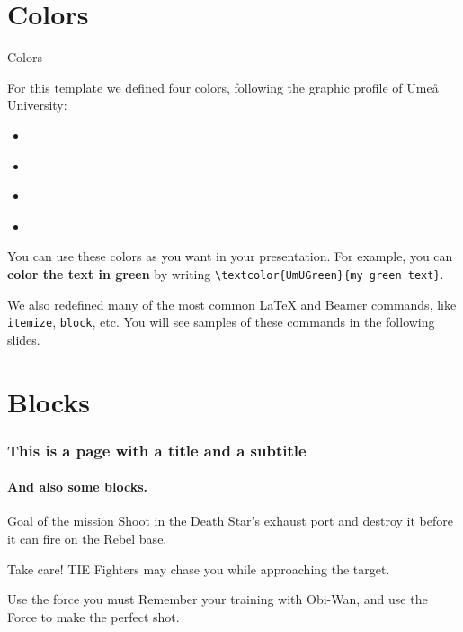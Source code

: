\documentclass[usenames,dvipsnames,10pt]{beamer}
\begin{document}
\section{Colors}

\begin{frame}{Colors}

For this template we defined four colors, following the graphic profile of Umeå University:
\begin{itemize}
\item \textcolor{white}{}
\item \textcolor{white}{}
\item \textcolor{white}{}
\item \textcolor{white}{}
\end{itemize}

\vskip 0.5cm

You can use these colors as you want in your presentation. For example, you can \textbf{\textcolor{UmUGreen}{color the text in green}} by writing \texttt{\textbackslash textcolor\{UmUGreen\}\{my green text\}}.

\vskip 0.5cm

We also redefined many of the most common \LaTeX{} and Beamer commands, like \texttt{itemize}, \texttt{block}, etc. You will see samples of these commands in the following slides.

\end{frame}

\section{Blocks}

\begin{frame} 
\frametitle{This is a page with a title and a subtitle} 
\framesubtitle{And also some blocks.} 
\begin{block}{Goal of the mission}
Shoot in the Death Star's exhaust port and destroy it before it can fire on the Rebel base.
\end{block} 
\begin{alertblock}{Take care!}
TIE Fighters may chase you while approaching the target.
\end{alertblock} 
\begin{exampleblock}{Use the force you must}
Remember your training with Obi-Wan, and use the Force to make the perfect shot.
\end{exampleblock} 

\end{frame}
\end{document}
